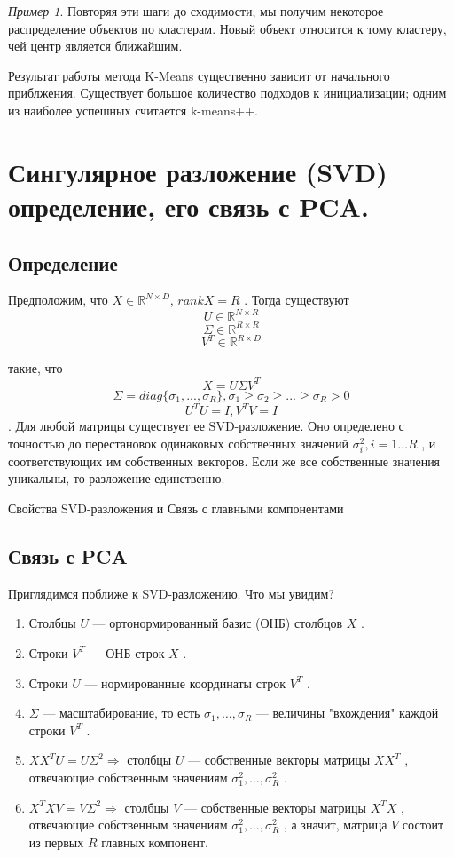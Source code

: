 \documentclass[a4paper, 12pt]{article}
\theoremstyle{plain} %
\theoremstyle{definition} %
\theoremstyle{remark} %
\newtheorem{example}{Пример}
\begin{document}
\begin{example}
Повторяя эти шаги до сходимости, мы получим некоторое распределение объектов по кластерам.
Новый объект относится к тому кластеру, чей центр является ближайшим.

Результат работы метода K-Means существенно зависит от начального приблжения.
Существует большое количество подходов к инициализации;
одним из наиболее успешных считается k-means++.

\section{Сингулярное разложение (SVD) определение, его связь с PCA.}

\subsection{Определение}

Предположим, что $ X \in \mathbb{R}^{N \times D}$, $rank X = R $
.
Тогда существуют
\[
 	U \in \mathbb{R}^{N \times R}
\]
\[
	\Sigma \in \mathbb{R}^{R \times R}
\]
\[
	V^T \in \mathbb{R}^{R \times D}
\]

такие, что
\[
	X = U\Sigma V^T
\]
\[
	\Sigma = diag\{\sigma_1, ..., \sigma_R\}, \sigma_1 \geq \sigma_2 \geq ... \geq \sigma_R > 0
\]
\[
	U^TU=I, V^TV=I
\]
.
Для любой матрицы существует ее SVD-разложение. Оно определено с точностью до перестановок одинаковых собственных значений $ \sigma_i^2, i = 1 \dots R $
, и соответствующих им собственных векторов. Если же все собственные значения уникальны, то разложение единственно.

 Свойства SVD-разложения и Связь с главными компонентами

\subsection{Связь с PCA}

Приглядимся поближе к SVD-разложению. Что мы увидим?
\begin{enumerate}
	\item Столбцы $ U $
    — ортонормированный базис (ОНБ) столбцов $ X $
   .
   	\item Строки $ V^T $
    — ОНБ строк $ X $
   .
   	\item Строки $ U $
    — нормированные координаты строк $ V^T $
   .
   	\item $ \Sigma $
    — масштабирование, то есть $ \sigma_1, \dots, \sigma_R $
    — величины "вхождения" каждой строки $ V^T $
   .
   	\item $ X X^T U = U \Sigma^2 \Rightarrow $
    столбцы $ U $
    — собственные векторы матрицы $ X X^T $
   , отвечающие собственным значениям  $ \sigma_1^2, \dots, \sigma_R^2 $
   .
   	\item $ X^T X V = V \Sigma^2  \Rightarrow $
    столбцы $ V $
    — собственные векторы матрицы $ X^T X $
   , отвечающие собственным значениям  $ \sigma_1^2, \dots, \sigma_R^2 $
   , а значит, матрица $ V $
    состоит из первых $ R $
    главных компонент.
\end{enumerate}


\end{example}
\end{document}
